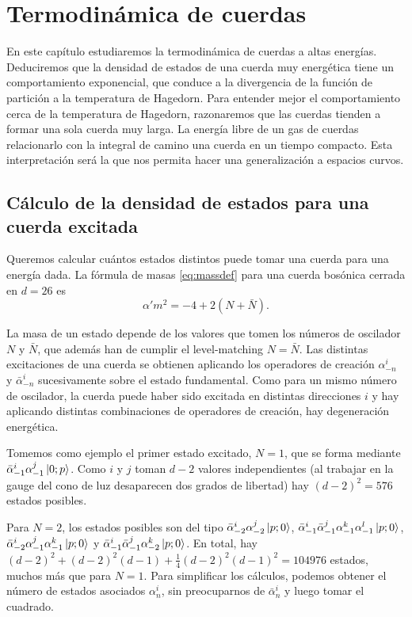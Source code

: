 \chapter{Termodinámica de cuerdas}

En este capítulo estudiaremos la termodinámica de cuerdas a altas energías.
Deduciremos que la densidad de estados de una cuerda muy energética tiene un comportamiento
exponencial, que conduce a la divergencia de la función de partición a la temperatura de 
Hagedorn.
Para entender mejor el comportamiento cerca de la temperatura de Hagedorn, razonaremos 
que las cuerdas tienden a formar una sola cuerda muy larga.
La energía libre de un gas de cuerdas relacionarlo con la integral de camino una cuerda
en un tiempo compacto.
Esta interpretación será la que nos permita hacer una generalización a espacios curvos.

\section{Cálculo de la densidad de estados para una cuerda excitada}

Queremos calcular cuántos estados distintos puede tomar una cuerda para una energía dada.
La fórmula de masas \ref{eq:massdef} para una cuerda bosónica cerrada en $d=26$ es
\begin{equation}
  \alpha' m^2=-4+2(N+\bar N).
\end{equation}

La masa de un estado depende de los valores que tomen los números de oscilador $N$ y $\bar N$, que además
han de cumplir el level-matching $N=\bar N$.
Las distintas excitaciones de una cuerda se obtienen aplicando los operadores
de creación $\alpha^i_{-n}$ y $\bar \alpha^i_{-n}$ sucesivamente sobre el estado fundamental.
Como para un mismo número de oscilador, la cuerda puede haber sido excitada en distintas direcciones
$i$ y hay aplicando distintas combinaciones de operadores de creación, hay degeneración energética.

Tomemos como ejemplo el primer estado excitado, $N=1$, que se forma mediante $\bar \alpha^i_{-1} \alpha^j_{-1} \ket{0;p}$.
Como $i$ y $j$ toman $d-2$ valores independientes (al trabajar en la gauge del cono de luz desaparecen dos grados de libertad)
hay $(d-2)^2=576$ estados posibles.

Para $N=2$, los estados posibles son del tipo $\bar \alpha^i_{-2} \alpha^j_{-2}\ket{p;0}$, 
$\bar \alpha^i_{-1} \bar \alpha^j_{-1} \alpha^k_{-1} \alpha^l_{-1} \ket{p;0}$,
$\bar \alpha^i_{-2} \alpha^j_{-1} \alpha^k_{-1}\ket{p;0}$ y $\bar \alpha^i_{-1} \bar \alpha^j_{-1} \alpha^k_{-2} \ket{p;0}$.
En total, hay $(d-2)^2 + (d-2)^2(d-1) + \frac{1}{4}(d-2)^2(d-1)^2= 104976$ estados, muchos más que para $N=1$.
Para simplificar los cálculos, podemos obtener el número de estados asociados $\alpha^i_n$,
sin preocuparnos de $\bar \alpha^i_n$ y luego tomar el cuadrado.

